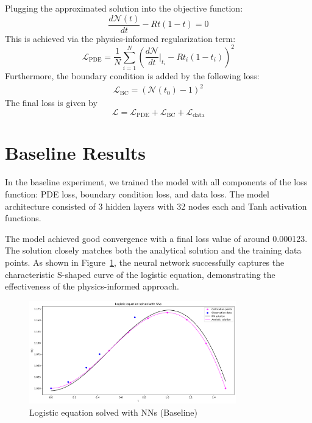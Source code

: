 \documentclass[11pt,a4paper]{article}
\begin{document}
Plugging the approximated solution into the objective function: 
\begin{equation}
    \frac{d\mathcal{N}(t)}{dt} - Rt(1-t) = 0
\end{equation}
This is achieved via the physics-informed regularization term:
\begin{equation}
    \mathcal{L}_\mathrm{PDE} = \frac{1}{N} \sum_{i=1}^N \left( \frac{d\mathcal{N}}{dt} \bigg\rvert_{t_i} - R t_i (1-t_i) \right)^2 
\end{equation}
Furthermore, the boundary condition is added by the following loss: 
\begin{eqnarray}
    \mathcal{L}_\mathrm{BC} = \left( \mathcal{N}(t_0) - 1 \right)^2
\end{eqnarray}
The final loss is given by
$$ \mathcal{L} = \mathcal{L}_\mathrm{PDE} + \mathcal{L}_\mathrm{BC} + \mathcal{L}_\mathrm{data} $$

\section{Baseline Results}
In the baseline experiment, we trained the model with all components of the loss function: PDE loss, boundary condition loss, and data loss. The model architecture consisted of 3 hidden layers with 32 nodes each and Tanh activation functions.

The model achieved good convergence with a final loss value of around 0.000123. The solution closely matches both the analytical solution and the training data points. As shown in Figure~\ref{fig:baseline}, the neural network successfully captures the characteristic S-shaped curve of the logistic equation, demonstrating the effectiveness of the physics-informed approach.

\begin{figure}[h]
    \centering
\includegraphics[width=0.8\textwidth]{figures/pinn_benchmark.png}
    \caption{Logistic equation solved with NNs (Baseline)}
    \label{fig:baseline}
\end{figure}
\end{document}
